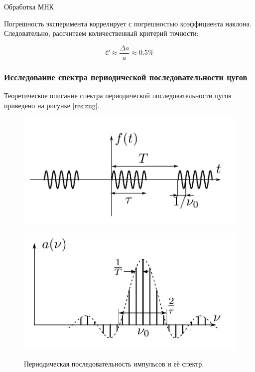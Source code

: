 \documentclass[12pt,a4paper]{article}
\begin{document}
\begin{table}[H]
	\footnotesize
	
	\caption{Обработка МНК}
	\label{tab:a11-mnk}
\end{table}

Погрешность эксперимента коррелирует с погрешностью коэффициента наклона. Следовательно, рассчитаем количественный критерий точности:

$$\mathcal{C} \approx \frac{\Delta a}{a} \approx 0.5 \% $$


\subsubsection*{Исследование спектра периодической последовательности цугов}

Теоретическое описание спектра периодической последовательности цугов приведено на рисунке \ref{res:zug}.

\begin{figure}[H]
	\centering
	\begin{minipage}[b]{.49\textwidth}
		\centering
		\includegraphics[width=0.9\linewidth]{"res/zug"}
		\caption{Периодическая последовательность импульсов и её спектр.}
		\label{res:zug}
	\end{minipage}%
	\begin{minipage}[b]{.49\textwidth}
		\centering
		\includegraphics[width=0.9\linewidth]{"res/zug_spectrum"}
		\label{res:zug_spectrum}
	\end{minipage}
\end{figure}
\end{document}
